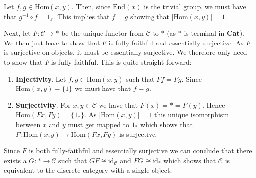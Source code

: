 \documentclass[a4paper]{article}
\begin{document}
  \begin{exercise}{4}
    Let $ f,g \in \text{Hom}(x, y) $. Then, since $ \text{End}(x) $ is the trivial group, we must have that $ g^{-1}\circ f = 1_x $. This implies that $ f = g $ showing that $ |\text{Hom}(x,y)| = 1 $.

    Next, let $ F: \mathcal{C} \to * $ be the unique functor from $ \mathcal{C} $ to $ * $ (as $ * $ is terminal in \textbf{Cat}). We then just have to show that $ F $ is fully-faithful and essentially surjective. As $ F $ is surjective on objects, it must be essentially surjective. We therefore only need to show that $ F $ is fully-faithful. This is quite straight-forward:

    \begin{enumerate}
      \item \textbf{Injectivity}. Let $ f,g \in \text{Hom}(x,y) $ such that $ Ff = Fg $. Since $ \text{Hom}(x,y) = \{1\} $ we must have that $ f = g $.

      \item \textbf{Surjectivity}. For $ x, y \in \mathcal{C} $ we have that $ F(x) = * = F(y) $. Hence $ \text{Hom}(Fx, Fy) = \{1_*\} $. As $ |\text{Hom}(x,y)| = 1 $ this unique isomorphism between $ x $ and $ y $ must get mapped to $ 1_* $ which shows that $ F: \text{Hom}(x,y) \to \text{Hom}(Fx,Fy) $ is surjective.
    \end{enumerate}

    Since $ F $ is both fully-faithful and essentially surjective we can conclude that there exists a $ G: * \to \mathcal{C} $ such that $ GF \cong \text{id}_\mathcal{C} $ and $ FG \cong \text{id}_* $ which shows that $ \mathcal{C} $ is equivalent to the discrete category with a single object.
  \end{exercise}
  
\end{document}
